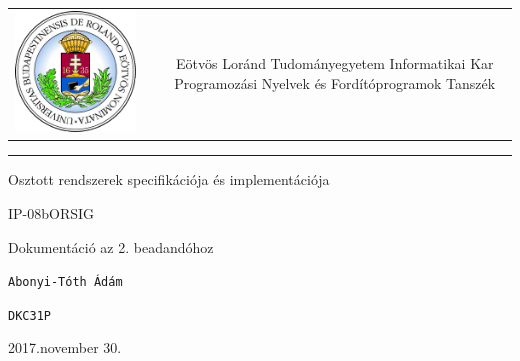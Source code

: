 \documentclass[12pt]{article}
\begin{document}
	
	

\begin{titlepage}
	\vspace*{0cm}
	\centering
	\begin{tabular}{cp{1cm}c}
		\begin{minipage}{4cm}
			\vspace{0pt}
			\includegraphics[width=1\textwidth]{elte_cimer}
		\end{minipage} & &
		\begin{minipage}{7cm}
			\vspace{0pt}Eötvös Loránd Tudományegyetem \vspace{10pt} \newline
			Informatikai Kar \vspace{10pt} \newline
			Programozási Nyelvek és Fordítóprogramok Tanszék
		\end{minipage}
	\end{tabular}
	
	\vspace*{0.2cm}
	\rule{\textwidth}{1pt}
	
	\vspace*{3cm}
	{\Huge Osztott rendszerek specifikációja és implementációja }
	
	\vspace*{0.5cm}
	{\normalsize IP-08bORSIG}
	
	\vspace{2cm}
	{\huge Dokumentáció az 2. beadandóhoz}
	
	\vspace*{5cm}
	
	{\large \verb|Abonyi-Tóth Ádám| } %
	
	{\large \verb|DKC31P| }  %
		
	
	\vfill
	
	\vspace*{1cm}
	2017.november 30. %
\end{titlepage}
\end{document}
